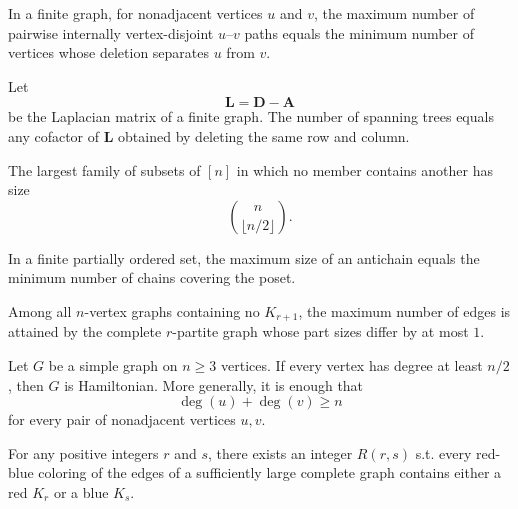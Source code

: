     \begin{theorem}
        In a finite graph, for nonadjacent vertices $u$ and $v$, the maximum
        number of pairwise internally vertex-disjoint $u$--$v$ paths equals the
        minimum number of vertices whose deletion separates $u$ from $v$.
    \end{theorem}

    \begin{theorem}
        Let
        \[
            \mathbf{L}=\mathbf{D}-\mathbf{A}
        \]
        be the Laplacian matrix of a finite graph. The number of spanning trees
        equals any cofactor of $\mathbf{L}$ obtained by deleting the same row
        and column.
    \end{theorem}

    \begin{theorem}
        The largest family of subsets of $[n]$ in which no member contains
        another has size
        \[
            \binom{n}{\lfloor n/2\rfloor}.
        \]
    \end{theorem}

    \begin{theorem}
        In a finite partially ordered set, the maximum size of an antichain
        equals the minimum number of chains covering the poset.
    \end{theorem}

    \begin{theorem}
        Among all $n$-vertex graphs containing no $K_{r+1}$, the maximum number
        of edges is attained by the complete $r$-partite graph whose part sizes
        differ by at most $1$.
    \end{theorem}

    \begin{theorem}
        Let $G$ be a simple graph on $n\geq3$ vertices. If every vertex has
        degree at least $n/2$, then $G$ is Hamiltonian. More generally, it is
        enough that
        \[
            \deg(u)+\deg(v)\geq n
        \]
        for every pair of nonadjacent vertices $u,v$.
    \end{theorem}

    \begin{theorem}
        For any positive integers $r$ and $s$, there exists an integer
        $R(r,s)$ s.t. every red-blue coloring of the edges of a sufficiently
        large complete graph contains either a red $K_r$ or a blue $K_s$.
    \end{theorem}


